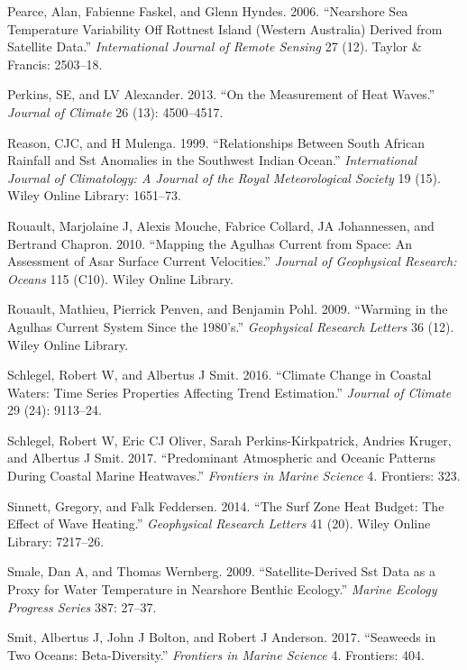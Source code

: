 \documentclass[12pt,A4paper,]{article}
\begin{document}
\hypertarget{ref-Pearce2006}{}
Pearce, Alan, Fabienne Faskel, and Glenn Hyndes. 2006. ``Nearshore Sea
Temperature Variability Off Rottnest Island (Western Australia) Derived
from Satellite Data.'' \emph{International Journal of Remote Sensing} 27
(12). Taylor \& Francis: 2503--18.

\hypertarget{ref-Perkins2013}{}
Perkins, SE, and LV Alexander. 2013. ``On the Measurement of Heat
Waves.'' \emph{Journal of Climate} 26 (13): 4500--4517.

\hypertarget{ref-Reason1999}{}
Reason, CJC, and H Mulenga. 1999. ``Relationships Between South African
Rainfall and Sst Anomalies in the Southwest Indian Ocean.''
\emph{International Journal of Climatology: A Journal of the Royal
Meteorological Society} 19 (15). Wiley Online Library: 1651--73.

\hypertarget{ref-Rouault2010}{}
Rouault, Marjolaine J, Alexis Mouche, Fabrice Collard, JA Johannessen,
and Bertrand Chapron. 2010. ``Mapping the Agulhas Current from Space: An
Assessment of Asar Surface Current Velocities.'' \emph{Journal of
Geophysical Research: Oceans} 115 (C10). Wiley Online Library.

\hypertarget{ref-Rouault2009}{}
Rouault, Mathieu, Pierrick Penven, and Benjamin Pohl. 2009. ``Warming in
the Agulhas Current System Since the 1980's.'' \emph{Geophysical
Research Letters} 36 (12). Wiley Online Library.

\hypertarget{ref-Schlegel2016}{}
Schlegel, Robert W, and Albertus J Smit. 2016. ``Climate Change in
Coastal Waters: Time Series Properties Affecting Trend Estimation.''
\emph{Journal of Climate} 29 (24): 9113--24.

\hypertarget{ref-Schlegel2017}{}
Schlegel, Robert W, Eric CJ Oliver, Sarah Perkins-Kirkpatrick, Andries
Kruger, and Albertus J Smit. 2017. ``Predominant Atmospheric and Oceanic
Patterns During Coastal Marine Heatwaves.'' \emph{Frontiers in Marine
Science} 4. Frontiers: 323.

\hypertarget{ref-Sinnett2014}{}
Sinnett, Gregory, and Falk Feddersen. 2014. ``The Surf Zone Heat Budget:
The Effect of Wave Heating.'' \emph{Geophysical Research Letters} 41
(20). Wiley Online Library: 7217--26.

\hypertarget{ref-Smale2009}{}
Smale, Dan A, and Thomas Wernberg. 2009. ``Satellite-Derived Sst Data as
a Proxy for Water Temperature in Nearshore Benthic Ecology.''
\emph{Marine Ecology Progress Series} 387: 27--37.

\hypertarget{ref-Smit2017}{}
Smit, Albertus J, John J Bolton, and Robert J Anderson. 2017. ``Seaweeds
in Two Oceans: Beta-Diversity.'' \emph{Frontiers in Marine Science} 4.
Frontiers: 404.
\end{document}
